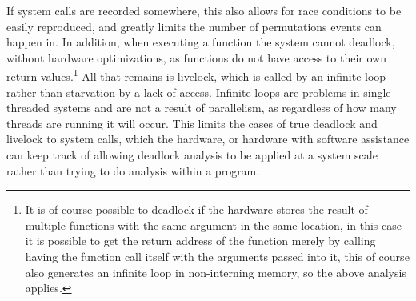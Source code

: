 \documentclass[12pt,letterpaper]{report}
\begin{document}
If system calls are recorded somewhere, this also allows for race conditions to be easily reproduced, and greatly limits the number of permutations events can happen in. In addition, when executing a function the system cannot deadlock, without hardware optimizations, as functions do not have access to their own return values.\footnote{It is of course possible to deadlock if the hardware stores the result of multiple functions with the same argument in the same location, in this case it is possible to get the return address of the function merely by calling having the function call itself with the arguments passed into it, this of course also generates an infinite loop in non-interning memory, so the above analysis applies.} All that remains is livelock, which is called by an infinite loop rather than starvation by a lack of access. Infinite loops are problems in single threaded systems and are not a result of parallelism, as regardless of how many threads are running it will occur. This limits the cases of true deadlock and livelock to system calls, which the hardware, or hardware with software assistance can keep track of allowing deadlock analysis to be applied at a system scale rather than trying to do analysis within a program.
\end{document}
